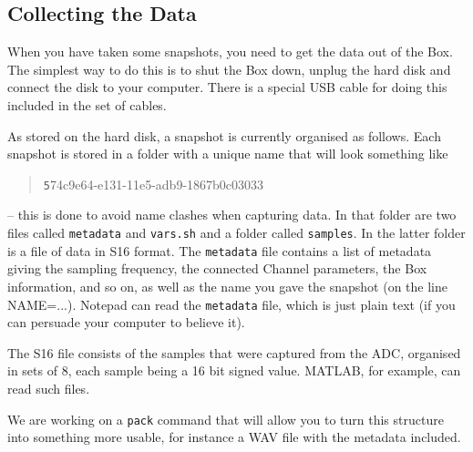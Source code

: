 \documentclass[12pt]{article}
\begin{document}
\subsection{Collecting the Data}

When you have taken some snapshots, you need to get the data out of
the Box.  The simplest way to do this is to shut the Box down, unplug
the hard disk and connect the disk to your computer.  There is a
special USB cable for doing this included in the set of cables.

As stored on the hard disk, a snapshot is currently organised as
follows.  Each snapshot is stored in a folder with a unique name that
will look something like
\begin{quotation}\texttt
   	574c9e64-e131-11e5-adb9-1867b0c03033
\end{quotation}
-- this is done to avoid name clashes when capturing data.  In that
folder are two files called \texttt{metadata} and \texttt{vars.sh} and
a folder called \texttt{samples}.  In the latter folder is a file of
data in S16 format.  The \texttt{metadata} file contains a list of
metadata giving the sampling frequency, the connected Channel
parameters, the Box information, and so on, as well as the name you
gave the snapshot (on the line NAME=...).  Notepad can read the
\texttt{metadata} file, which is just plain text (if you can persuade
your computer to believe it).

The S16 file consists of the samples that were captured from the ADC,
organised in sets of 8, each sample being a 16 bit signed value.
MATLAB, for example, can read such files.

We are working on a \texttt{pack} command that will allow you to turn
this structure into something more usable, for instance a WAV file
with the metadata included.
\end{document}
